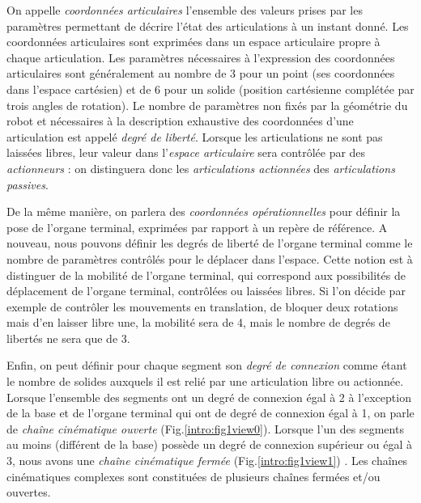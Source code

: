 On appelle {\it coordonnées articulaires} l'ensemble des valeurs prises par les paramètres permettant de décrire l'état des articulations à un instant donné. Les coordonnées articulaires sont exprimées dans un espace articulaire propre à chaque articulation. Les paramètres nécessaires à l'expression des coordonnées articulaires sont généralement au nombre de 3 pour un point (ses coordonnées dans l'espace cartésien) et de 6 pour un solide (position cartésienne complétée par trois angles de rotation). Le nombre de paramètres non fixés par la géométrie du robot et nécessaires à la description exhaustive des coordonnées d'une articulation est appelé {\it degré de liberté}. Lorsque les articulations ne sont pas laissées libres, leur valeur dans l'{\it espace articulaire} sera contr\^olée par des {\it actionneurs} : on distinguera donc les {\it articulations actionnées} des {\it articulations passives}.

De la même manière, on parlera des {\it coordonnées opérationnelles} pour définir la pose de l'organe terminal, exprimées par rapport à un repère de référence. A nouveau, nous pouvons définir les degrés de liberté de l'organe terminal comme le nombre de paramètres contr\^olés pour le déplacer dans l'espace. Cette notion est à distinguer de la mobilité de l'organe terminal, qui correspond aux possibilités de déplacement de l'organe terminal, contrôlées ou laissées libres. Si l'on décide par exemple de contr\^oler les mouvements en translation, de bloquer deux rotations mais d'en laisser libre une, la mobilité sera de 4, mais le nombre de degrés de libertés ne sera que de 3.

Enfin, on peut définir pour chaque segment son {\it degré de connexion} comme étant le nombre de solides auxquels il est relié par une articulation libre ou actionnée. Lorsque l'ensemble des segments ont un degré de connexion égal à 2 à l'exception de la base et de l'organe terminal qui ont de degré de connexion égal à 1, on parle de {\it cha\^ine cinématique ouverte} (Fig.\ref{intro:fig1view0}). Lorsque l'un des segments au moins (différent de la base) possède un degré de connexion supérieur ou égal à 3, nous avons une {\it cha\^ine cinématique fermée} (Fig.\ref{intro:fig1view1}) \cite{journals/gosselin1989}. Les cha\^ines cinématiques complexes sont constituées de plusieurs cha\^ines fermées et/ou ouvertes.

